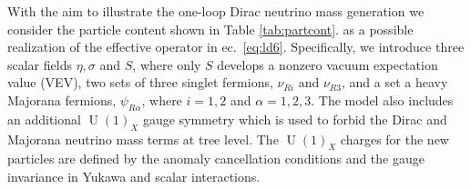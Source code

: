 \documentclass[12pt]{article}
\begin{document}
With the aim to illustrate the one-loop Dirac neutrino mass generation
we consider the particle content shown in Table \ref{tab:partcont}. as
a possible realization of the effective operator in
ec.~\eqref{eq:ld6}. Specifically, we introduce three scalar fields
$\eta, \sigma$ and $S$, where only $S$ develops a nonzero vacuum
expectation value (VEV),  two sets of three singlet fermions,
$\nu_{Ri}$ and $\nu_{R3}$, and a set a heavy Majorana fermions, $\psi_{R\alpha}$, where $i=1,2$ and
$\alpha=1,2,3$.  The model also includes an additional $\operatorname{U}(1)_X$ gauge
symmetry which is used to forbid the Dirac and Majorana neutrino mass
terms at tree level.
The $\operatorname{U}(1)_X$ charges for the new particles are defined by the anomaly cancellation conditions and the gauge invariance in Yukawa and scalar interactions.
\end{document}
